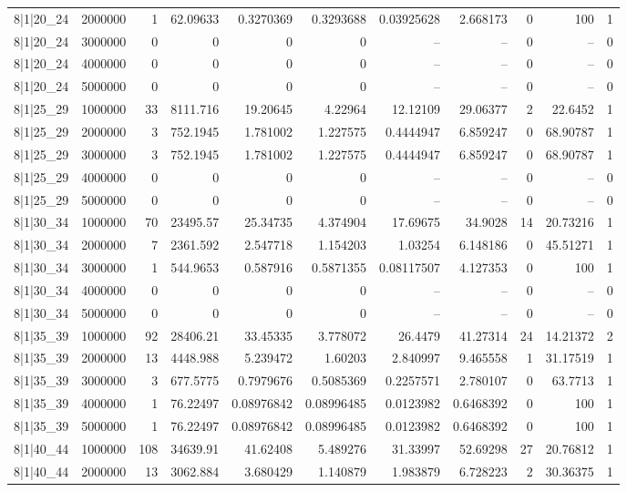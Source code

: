 \begin{tabular}{lrrrrrrrrrr}
8|1|20\_24 & 2000000 & 1 & 62.09633 & 0.3270369 & 0.3293688 & 0.03925628 & 2.668173 & 0 & 100 & 1 \\
8|1|20\_24 & 3000000 & 0 & 0 & 0 & 0 & -- & -- & 0 & -- & 0 \\
8|1|20\_24 & 4000000 & 0 & 0 & 0 & 0 & -- & -- & 0 & -- & 0 \\
8|1|20\_24 & 5000000 & 0 & 0 & 0 & 0 & -- & -- & 0 & -- & 0 \\
8|1|25\_29 & 1000000 & 33 & 8111.716 & 19.20645 & 4.22964 & 12.12109 & 29.06377 & 2 & 22.6452 & 1 \\
8|1|25\_29 & 2000000 & 3 & 752.1945 & 1.781002 & 1.227575 & 0.4444947 & 6.859247 & 0 & 68.90787 & 1 \\
8|1|25\_29 & 3000000 & 3 & 752.1945 & 1.781002 & 1.227575 & 0.4444947 & 6.859247 & 0 & 68.90787 & 1 \\
8|1|25\_29 & 4000000 & 0 & 0 & 0 & 0 & -- & -- & 0 & -- & 0 \\
8|1|25\_29 & 5000000 & 0 & 0 & 0 & 0 & -- & -- & 0 & -- & 0 \\
8|1|30\_34 & 1000000 & 70 & 23495.57 & 25.34735 & 4.374904 & 17.69675 & 34.9028 & 14 & 20.73216 & 1 \\
8|1|30\_34 & 2000000 & 7 & 2361.592 & 2.547718 & 1.154203 & 1.03254 & 6.148186 & 0 & 45.51271 & 1 \\
8|1|30\_34 & 3000000 & 1 & 544.9653 & 0.587916 & 0.5871355 & 0.08117507 & 4.127353 & 0 & 100 & 1 \\
8|1|30\_34 & 4000000 & 0 & 0 & 0 & 0 & -- & -- & 0 & -- & 0 \\
8|1|30\_34 & 5000000 & 0 & 0 & 0 & 0 & -- & -- & 0 & -- & 0 \\
8|1|35\_39 & 1000000 & 92 & 28406.21 & 33.45335 & 3.778072 & 26.4479 & 41.27314 & 24 & 14.21372 & 2 \\
8|1|35\_39 & 2000000 & 13 & 4448.988 & 5.239472 & 1.60203 & 2.840997 & 9.465558 & 1 & 31.17519 & 1 \\
8|1|35\_39 & 3000000 & 3 & 677.5775 & 0.7979676 & 0.5085369 & 0.2257571 & 2.780107 & 0 & 63.7713 & 1 \\
8|1|35\_39 & 4000000 & 1 & 76.22497 & 0.08976842 & 0.08996485 & 0.0123982 & 0.6468392 & 0 & 100 & 1 \\
8|1|35\_39 & 5000000 & 1 & 76.22497 & 0.08976842 & 0.08996485 & 0.0123982 & 0.6468392 & 0 & 100 & 1 \\
8|1|40\_44 & 1000000 & 108 & 34639.91 & 41.62408 & 5.489276 & 31.33997 & 52.69298 & 27 & 20.76812 & 1 \\
8|1|40\_44 & 2000000 & 13 & 3062.884 & 3.680429 & 1.140879 & 1.983879 & 6.728223 & 2 & 30.36375 & 1 \\

\end{tabular}
